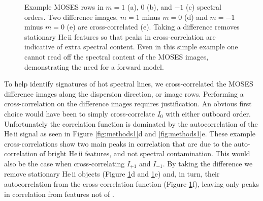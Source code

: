 \begin{figure}
{
 	 		}
 	 		\caption{Example MOSES rows in $m = 1$ (a), 0 (b), and $-1$ (c) spectral orders.  Two difference images, $m=1$ minus $m=0$ (d) and $m=-1$ minus $m=0$ (e) are cross-correlated (e).  Taking a difference removes stationary He\,{\sc ii} features so that peaks in cross-correlation are indicative of extra spectral content.  Even in this simple example one cannot read off the spectral content of the MOSES images, demonstrating the need for a forward model.}
 	 		\label{fig:methods2}
 	 	\end{figure}
        
        To help identify signatures of hot spectral lines, we cross-correlated the MOSES difference images along the dispersion direction, or image rows.
        Performing a cross-correlation on the difference images requires justification.  
        An obvious first choice would have been to simply cross-correlate $I_0$ with either outboard order.  
        Unfortunately the correlation function is dominated by the autocorrelation of the He\,{\sc ii} signal as seen in Figure \ref{fig:methods1}d and \ref{fig:methods1}e.  
        These example cross-correlations show two main peaks in correlation that are due to the auto-correlation of bright He\,{\sc ii} features, and not spectral contamination.  
        This would also be the case when cross-correlating $I_{+1}$ and $I_{-1}$.  
        By taking the difference we remove stationary He\,{\sc ii} objects (Figure \ref{fig:methods2}d and \ref{fig:methods2}e) and, in turn, their autocorrelation from the cross-correlation function (Figure \ref{fig:methods2}f), leaving only peaks in correlation from features not of \heii.
 	
